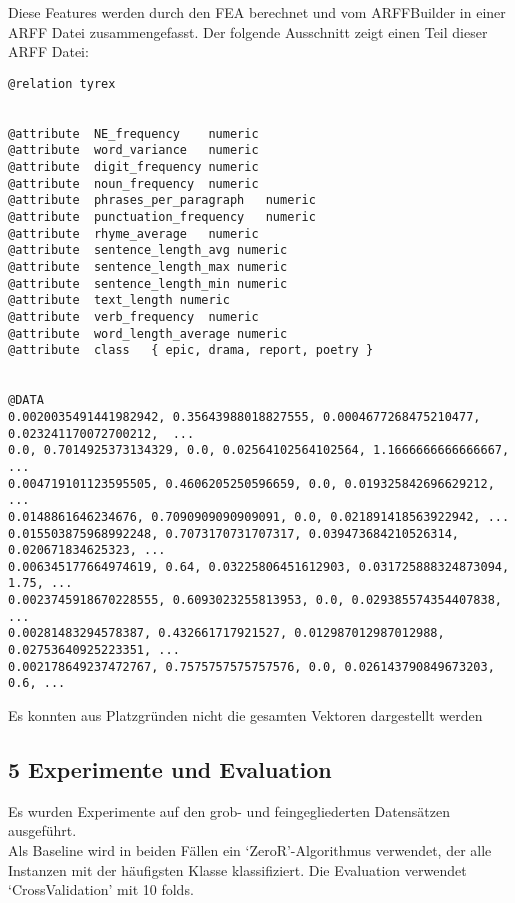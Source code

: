 \documentclass[]{article}
\begin{document}
Diese Features werden durch den FEA berechnet und vom ARFFBuilder in
einer ARFF Datei zusammengefasst. Der folgende Ausschnitt zeigt einen
Teil dieser ARFF Datei:

\vspace{4 mm}\begin{verbatim}
@relation tyrex


@attribute  NE_frequency    numeric
@attribute  word_variance   numeric
@attribute  digit_frequency numeric
@attribute  noun_frequency  numeric
@attribute  phrases_per_paragraph   numeric
@attribute  punctuation_frequency   numeric
@attribute  rhyme_average   numeric
@attribute  sentence_length_avg numeric
@attribute  sentence_length_max numeric
@attribute  sentence_length_min numeric
@attribute  text_length numeric
@attribute  verb_frequency  numeric
@attribute  word_length_average numeric
@attribute  class   { epic, drama, report, poetry }


@DATA
0.0020035491441982942, 0.35643988018827555, 0.0004677268475210477, 0.023241170072700212,  ...
0.0, 0.7014925373134329, 0.0, 0.02564102564102564, 1.1666666666666667, ...
0.004719101123595505, 0.4606205250596659, 0.0, 0.019325842696629212, ...
0.0148861646234676, 0.7090909090909091, 0.0, 0.021891418563922942, ...
0.015503875968992248, 0.7073170731707317, 0.039473684210526314, 0.020671834625323, ...
0.006345177664974619, 0.64, 0.03225806451612903, 0.031725888324873094, 1.75, ...
0.0023745918670228555, 0.6093023255813953, 0.0, 0.029385574354407838, ...
0.00281483294578387, 0.432661717921527, 0.012987012987012988, 0.02753640925223351, ...
0.002178649237472767, 0.7575757575757576, 0.0, 0.026143790849673203, 0.6, ...
\end{verbatim}
\begin{tiny}Es konnten aus Platzgründen nicht die gesamten Vektoren dargestellt werden\end{tiny}
\vspace{4 mm}

\subsection{5 Experimente und
Evaluation}\label{experimente-und-evaluation}

Es wurden Experimente auf den grob- und feingegliederten Datensätzen
ausgeführt.\\
Als Baseline wird in beiden Fällen ein `ZeroR'-Algorithmus verwendet,
der alle Instanzen mit der häufigsten Klasse klassifiziert. Die
Evaluation verwendet `CrossValidation' mit 10 folds.
\end{document}
